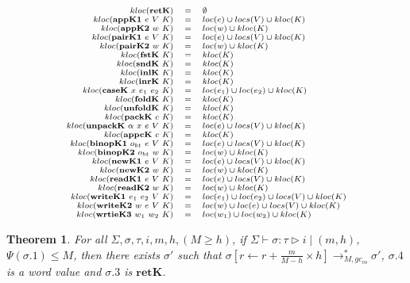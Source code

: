 \documentclass[fleqn]{article}
\newtheorem{theorem}{Theorem}
\begin{document}
\[
\scriptsize
\begin{array}{rcl}
kloc(\mathbf{retK}) & = & \emptyset \\
kloc(\mathbf{appK1}~e~V~K) & = & loc(e) \cup locs(V) \cup kloc(K) \\
kloc(\mathbf{appK2}~w~K) & = & loc(w) \cup kloc(K) \\
kloc(\mathbf{pairK1}~e~V~K) & = & loc(e) \cup locs(V) \cup kloc(K) \\
kloc(\mathbf{pairK2}~w~K) & = & loc(w) \cup kloc(K) \\
kloc(\mathbf{fstK}~K) & = & kloc(K) \\
kloc(\mathbf{sndK}~K) & = & kloc(K) \\
kloc(\mathbf{inlK}~K) & = & kloc(K) \\
kloc(\mathbf{inrK}~K) & = & kloc(K) \\
kloc(\mathbf{caseK}~x~e_1~e_2~K) & = & loc(e_1) \cup loc(e_2) \cup kloc(K) \\
kloc(\mathbf{foldK}~K) & = & kloc(K) \\
kloc(\mathbf{unfoldK}~K) & = & kloc(K) \\
kloc(\mathbf{packK}~c~K) & = & kloc(K) \\
kloc(\mathbf{unpackK}~\alpha~x~e~V~K) & = & loc(e) \cup locs(V) \cup kloc(K) \\
kloc(\mathbf{appcK}~c~K) & = & kloc(K) \\
kloc(\mathbf{binopK1}~o_{bt}~e~V~K) & = & loc(e) \cup locs(V) \cup kloc(K) \\
kloc(\mathbf{binopK2}~o_{bt}~w~K) & = & loc(w) \cup kloc(K) \\
kloc(\mathbf{newK1}~e~V~K) & = & loc(e) \cup locs(V) \cup kloc(K) \\
kloc(\mathbf{newK2}~w~K) & = & loc(w) \cup kloc(K) \\
kloc(\mathbf{readK1}~e~V~K) & = & loc(e) \cup locs(V) \cup kloc(K) \\
kloc(\mathbf{readK2}~w~K) & = & loc(w) \cup kloc(K) \\
kloc(\mathbf{writeK1}~e_1~e_2~V~K) & = & loc(e_1) \cup loc(e_2) \cup locs(V) \cup kloc(K) \\
kloc(\mathbf{writeK2}~w~e~V~K) & = & loc(w) \cup loc(e) \cup locs(V) \cup kloc(K) \\
kloc(\mathbf{wrtieK3}~w_1~w_2~K) & = & loc(w_1) \cup loc(w_2) \cup kloc(K)
\end{array}
\]

\begin{theorem}
	For all $\Sigma,\sigma,\tau,i,m,h,(M \ge h)$, if $\Sigma \vdash \sigma : \tau \triangleright i \mid (m,h)$, $\Psi(\sigma.1) \le M$,
	then there exists $\sigma'$ such that $\sigma[r \leftarrow r+ \frac{m}{M-h}\times h] \longrightarrow_{M,gc_{co}}^* \sigma'$,
	$\sigma.4$ is a word value and $\sigma.3$ is $\mathbf{retK}$.
\end{theorem}
\end{document}
